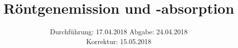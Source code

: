 

\subject{602}
\title{Röntgenemission und -absorption}
\date{%
  Durchführung: 17.04.2018
  \hspace{3em}
  Abgabe: 24.04.2018\\
  Korrektur: 15.05.2018
}



\maketitle
\thispagestyle{empty}
\tableofcontents
\newpage
\setlength{\parindent}{0em}





% 



\printbibliography{}


